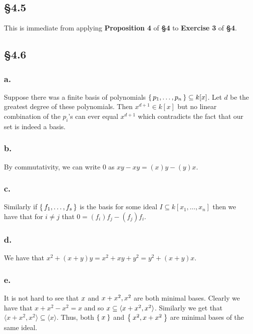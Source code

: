 \documentclass[letterpaper]{article}
\begin{document}
\subsection*{\S 4.5}

This is immediate from applying \textbf{Proposition 4} of \textbf{\S 4} to \textbf{Exercise 3} of \textbf{\S 4}.

\subsection*{\S 4.6}

\subsubsection*{a.}

Suppose there was a finite basis of polynomials $\set{p_{1}, \ldots, p_{n}} \subseteq k[x]$.
Let $d$ be the greatest degree of these polynomials.
Then $x^{d + 1} \in k[x]$ but no linear combination of the $p_{i}$'s can ever equal $x^{d + 1}$ which contradicts the fact that our set is indeed a basis.

\subsubsection*{b.}

By commutativity, we can write $0$ as $xy - xy = (x)y - (y)x$.

\subsubsection*{c.}

Similarly if $\set{f_{1}, \ldots, f_{s}}$ is the basis for some ideal $I \subseteq k[x_{1}, \ldots, x_{n}]$ then we have that for $i \neq j$ that $0 = (f_{i}) f_{j} - (f_{j}) f_{i}$.

\subsubsection*{d.}

We have that $x^{2} + (x + y)y = x^{2} + xy + y^{2} = y^{2} + (x + y)x$.

\subsubsection*{e.}

It is not hard to see that $\ideal{x}$ and $\ideal{x + x^{2}, x^{2}}$ are both minimal bases.
Clearly we have that $x + x^{2} - x^{2} = x$ and so $\gen{x} \subseteq \langle x + x^{2}, x^{2} \rangle$.
Similarly we get that $\langle x + x^{2}, x^{2} \rangle \subseteq \langle x \rangle$.
Thus, both $\Set{x}$ and $\Set{x^{2}, x + x^{2}}$ are minimal bases of the same ideal.
\end{document}
